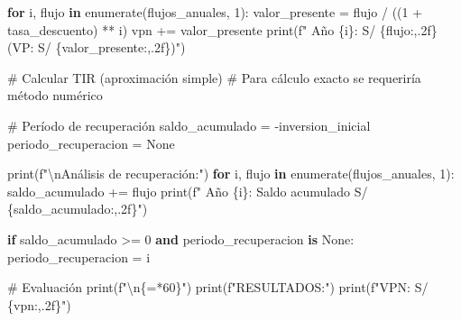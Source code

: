 \documentclass[
  doc,
  floatsintext,
  longtable,
  a4paper,
  nolmodern,
  notxfonts,
  notimes,
  12pt,
  colorlinks=true,linkcolor=blue,citecolor=blue,urlcolor=blue]{apa7}
\newenvironment{Shaded}{\begin{snugshade}}{\end{snugshade}}
\newcommand{\BuiltInTok}[1]{\textcolor[rgb]{0.00,0.23,0.31}{#1}}
\newcommand{\CharTok}[1]{\textcolor[rgb]{0.13,0.47,0.30}{#1}}
\newcommand{\CommentTok}[1]{\textcolor[rgb]{0.37,0.37,0.37}{#1}}
\newcommand{\ControlFlowTok}[1]{\textcolor[rgb]{0.00,0.23,0.31}{\textbf{#1}}}
\newcommand{\DecValTok}[1]{\textcolor[rgb]{0.68,0.00,0.00}{#1}}
\newcommand{\KeywordTok}[1]{\textcolor[rgb]{0.00,0.23,0.31}{\textbf{#1}}}
\newcommand{\NormalTok}[1]{\textcolor[rgb]{0.00,0.23,0.31}{#1}}
\newcommand{\OperatorTok}[1]{\textcolor[rgb]{0.37,0.37,0.37}{#1}}
\newcommand{\SpecialCharTok}[1]{\textcolor[rgb]{0.37,0.37,0.37}{#1}}
\newcommand{\SpecialStringTok}[1]{\textcolor[rgb]{0.13,0.47,0.30}{#1}}
\newcommand{\StringTok}[1]{\textcolor[rgb]{0.13,0.47,0.30}{#1}}
\newcommand{\VariableTok}[1]{\textcolor[rgb]{0.07,0.07,0.07}{#1}}
\begin{document}
\begin{Shaded}
\begin{Highlighting}[]
        \ControlFlowTok{for}\NormalTok{ i, flujo }\KeywordTok{in} \BuiltInTok{enumerate}\NormalTok{(flujos\_anuales, }\DecValTok{1}\NormalTok{):}
\NormalTok{            valor\_presente }\OperatorTok{=}\NormalTok{ flujo }\OperatorTok{/}\NormalTok{ ((}\DecValTok{1} \OperatorTok{+}\NormalTok{ tasa\_descuento) }\OperatorTok{**}\NormalTok{ i)}
\NormalTok{            vpn }\OperatorTok{+=}\NormalTok{ valor\_presente}
            \BuiltInTok{print}\NormalTok{(}\SpecialStringTok{f"  Año }\SpecialCharTok{\{}\NormalTok{i}\SpecialCharTok{\}}\SpecialStringTok{: S/ }\SpecialCharTok{\{}\NormalTok{flujo}\SpecialCharTok{:,.2f\}}\SpecialStringTok{ (VP: S/ }\SpecialCharTok{\{}\NormalTok{valor\_presente}\SpecialCharTok{:,.2f\}}\SpecialStringTok{)"}\NormalTok{)}
        
        \CommentTok{\# Calcular TIR (aproximación simple)}
        \CommentTok{\# Para cálculo exacto se requeriría método numérico}
        
        \CommentTok{\# Período de recuperación}
\NormalTok{        saldo\_acumulado }\OperatorTok{=} \OperatorTok{{-}}\NormalTok{inversion\_inicial}
\NormalTok{        periodo\_recuperacion }\OperatorTok{=} \VariableTok{None}
        
        \BuiltInTok{print}\NormalTok{(}\SpecialStringTok{f"}\CharTok{\textbackslash{}n}\SpecialStringTok{Análisis de recuperación:"}\NormalTok{)}
        \ControlFlowTok{for}\NormalTok{ i, flujo }\KeywordTok{in} \BuiltInTok{enumerate}\NormalTok{(flujos\_anuales, }\DecValTok{1}\NormalTok{):}
\NormalTok{            saldo\_acumulado }\OperatorTok{+=}\NormalTok{ flujo}
            \BuiltInTok{print}\NormalTok{(}\SpecialStringTok{f"  Año }\SpecialCharTok{\{}\NormalTok{i}\SpecialCharTok{\}}\SpecialStringTok{: Saldo acumulado S/ }\SpecialCharTok{\{}\NormalTok{saldo\_acumulado}\SpecialCharTok{:,.2f\}}\SpecialStringTok{"}\NormalTok{)}
            
            \ControlFlowTok{if}\NormalTok{ saldo\_acumulado }\OperatorTok{\textgreater{}=} \DecValTok{0} \KeywordTok{and}\NormalTok{ periodo\_recuperacion }\KeywordTok{is} \VariableTok{None}\NormalTok{:}
\NormalTok{                periodo\_recuperacion }\OperatorTok{=}\NormalTok{ i}
        
        \CommentTok{\# Evaluación}
        \BuiltInTok{print}\NormalTok{(}\SpecialStringTok{f"}\CharTok{\textbackslash{}n}\SpecialCharTok{\{}\StringTok{\textquotesingle{}=\textquotesingle{}}\OperatorTok{*}\DecValTok{60}\SpecialCharTok{\}}\SpecialStringTok{"}\NormalTok{)}
        \BuiltInTok{print}\NormalTok{(}\SpecialStringTok{f"RESULTADOS:"}\NormalTok{)}
        \BuiltInTok{print}\NormalTok{(}\SpecialStringTok{f"VPN: S/ }\SpecialCharTok{\{}\NormalTok{vpn}\SpecialCharTok{:,.2f\}}\SpecialStringTok{"}\NormalTok{)}
        

\end{Highlighting}
\end{Shaded}
\end{document}
